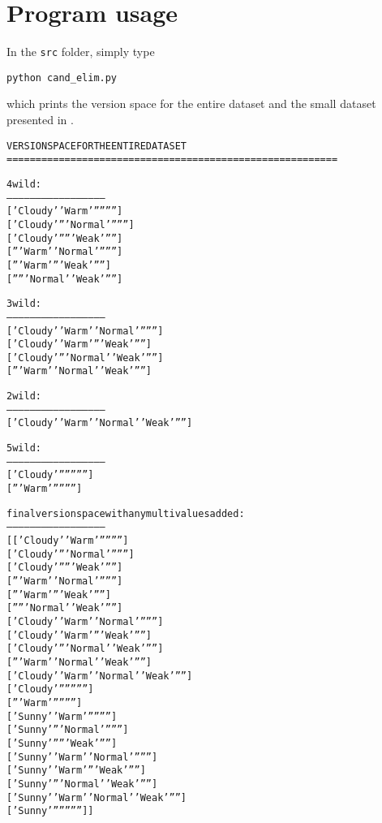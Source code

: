 
\section{Program usage}

In the \texttt{src} folder, simply type

\centerline{\texttt{python cand\_elim.py}}

\vspace{2mm}
\noindent which prints the version space for the entire dataset and the small dataset presented in \cite{mitchell}.

\begin{multicols}{2}
\begin{shaded}
\scriptsize
\begin{alltt}
VERSION SPACE FOR THE ENTIRE DATASET
=========================================================

 4 wild :
--------------------------------------------------
['Cloudy' 'Warm' '' '' '' '']
['Cloudy' '' 'Normal' '' '' '']
['Cloudy' '' '' 'Weak' '' '']
['' 'Warm' 'Normal' '' '' '']
['' 'Warm' '' 'Weak' '' '']
['' '' 'Normal' 'Weak' '' '']

 3 wild :
--------------------------------------------------
['Cloudy' 'Warm' 'Normal' '' '' '']
['Cloudy' 'Warm' '' 'Weak' '' '']
['Cloudy' '' 'Normal' 'Weak' '' '']
['' 'Warm' 'Normal' 'Weak' '' '']

 2 wild :
--------------------------------------------------
['Cloudy' 'Warm' 'Normal' 'Weak' '' '']

 5 wild :
--------------------------------------------------
['Cloudy' '' '' '' '' '']
['' 'Warm' '' '' '' '']


 final version space with any multivalues added :
--------------------------------------------------
[['Cloudy' 'Warm' '' '' '' '']
 ['Cloudy' '' 'Normal' '' '' '']
 ['Cloudy' '' '' 'Weak' '' '']
 ['' 'Warm' 'Normal' '' '' '']
 ['' 'Warm' '' 'Weak' '' '']
 ['' '' 'Normal' 'Weak' '' '']
 ['Cloudy' 'Warm' 'Normal' '' '' '']
 ['Cloudy' 'Warm' '' 'Weak' '' '']
 ['Cloudy' '' 'Normal' 'Weak' '' '']
 ['' 'Warm' 'Normal' 'Weak' '' '']
 ['Cloudy' 'Warm' 'Normal' 'Weak' '' '']
 ['Cloudy' '' '' '' '' '']
 ['' 'Warm' '' '' '' '']
 ['Sunny' 'Warm' '' '' '' '']
 ['Sunny' '' 'Normal' '' '' '']
 ['Sunny' '' '' 'Weak' '' '']
 ['Sunny' 'Warm' 'Normal' '' '' '']
 ['Sunny' 'Warm' '' 'Weak' '' '']
 ['Sunny' '' 'Normal' 'Weak' '' '']
 ['Sunny' 'Warm' 'Normal' 'Weak' '' '']
 ['Sunny' '' '' '' '' '']]
\end{alltt}
\small
\end{shaded}


\end{multicols}
